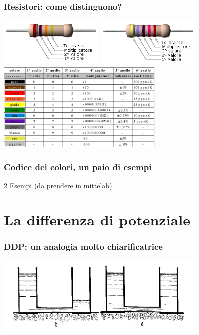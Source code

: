 		\begin{frame}[c]\frametitle{Resistori: come distinguono?}
			\includegraphics[width= 5cm]{./img/r5.png}
		    \includegraphics[width= 5cm]{./img/r1.png}\\
		    \centering \includegraphics[width= 8cm]{./img/codice.png}
		\end{frame}
		
		\begin{frame}[c]\frametitle{Codice dei colori, un paio di esempi}
		    
		 2 Esempi (da prendere in mittelab)
		
		\end{frame}

	\section{La differenza di potenziale} %
	\label{sec:la_differenza_di_potenziale}
		\begin{frame}[c]\frametitle{DDP: un analogia molto chiarificatrice}
		    
			\includegraphics[width=10cm]{./img/ddp1.png}
		
		\end{frame}


